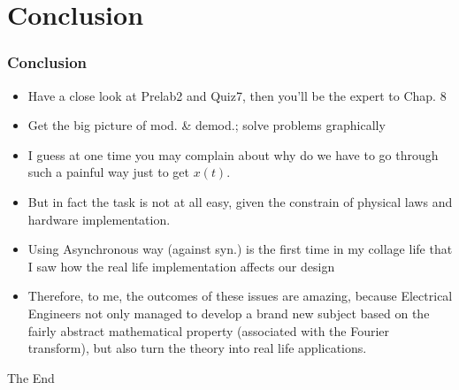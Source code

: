 \documentclass{beamer}
\begin{document}
\section{Conclusion}
\begin{frame}
    \frametitle{Conclusion}
    \begin{itemize}
    \item Have a close look at Prelab2 and Quiz7, then you'll be the expert to Chap. 8
    \item Get the big picture of mod. \& demod.; solve problems graphically 
    \item I guess at one time you may complain about why do we have to go through such a painful way just to get $x(t)$. 
    \item But in fact the task is not at all easy, given the constrain of physical laws and hardware implementation.
    \item Using Asynchronous way (against syn.) is the first time in my collage life that I saw how the real life implementation affects our design 
    \item Therefore, to me, the outcomes of these issues are amazing, because Electrical Engineers not only managed to develop a brand new subject based on the fairly abstract mathematical property (associated with the Fourier transform), but also turn the theory into real life applications. 
     \end{itemize}
\end{frame}


\begin{frame}
\Huge{\centerline{The End}}
\end{frame}

\end{document}

